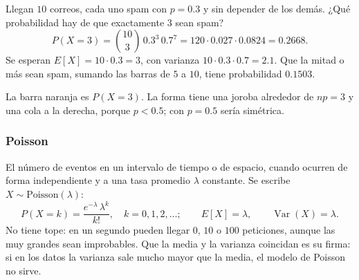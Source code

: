 \documentclass[11pt,letterpaper]{article}
\begin{document}
\begin{ejemplo}
    Llegan $10$ correos, cada uno spam con $p = 0.3$ y sin depender de
    los demás. ¿Qué probabilidad hay de que exactamente $3$ sean
    spam?
    \[
        P(X = 3) = \binom{10}{3}\, 0.3^{3}\, 0.7^{7}
                 = 120 \cdot 0.027 \cdot 0.0824 = 0.2668 .
    \]
    Se esperan $E[X] = 10 \cdot 0.3 = 3$, con varianza
    $10 \cdot 0.3 \cdot 0.7 = 2.1$. Que la mitad o más sean spam,
    sumando las barras de $5$ a $10$, tiene probabilidad $0.1503$.
    \begin{center}
    \end{center}
    La barra naranja es $P(X = 3)$. La forma tiene una joroba alrededor
    de $np = 3$ y una cola a la derecha, porque $p < 0.5$; con
    $p = 0.5$ sería simétrica.
\end{ejemplo}

\subsubsection*{Poisson}

El número de eventos en un intervalo de tiempo o de espacio, cuando
ocurren de forma independiente y a una tasa promedio $\lambda$
constante. Se escribe $X \sim \text{Poisson}(\lambda)$:
\[
    P(X = k) = \frac{e^{-\lambda}\, \lambda^{k}}{k!} ,
    \quad k = 0, 1, 2, \ldots ;
    \qquad E[X] = \lambda , \qquad \operatorname{Var}(X) = \lambda .
\]
No tiene tope: en un segundo pueden llegar $0$, $10$ o $100$
peticiones, aunque las muy grandes sean improbables. Que la media y la
varianza coincidan es su firma: si en los datos la varianza sale mucho
mayor que la media, el modelo de Poisson no sirve.
\end{document}
